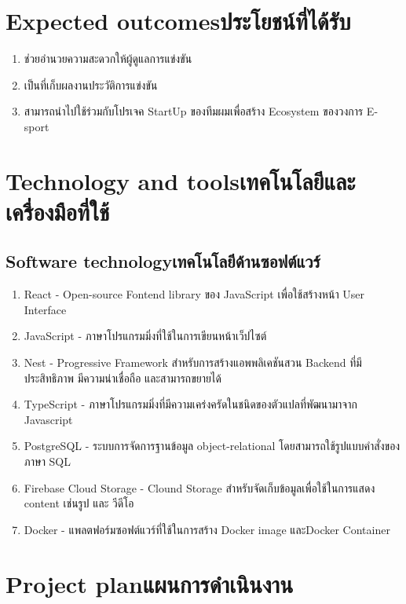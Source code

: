 \section{\ifenglish Expected outcomes\else ประโยชน์ที่ได้รับ\fi}
\begin{enumerate}
    \item ช่วยอำนวยความสะดวกให้ผู้ดูแลการแข่งขัน
    \item เป็นที่เก็บผลงานประวัติการแข่งขัน
    \item สามารถนำไปใช้ร่วมกับโปรเจค StartUp ของทีมผมเพื่อสร้าง Ecosystem ของวงการ E-sport
\end{enumerate}

\section{\ifenglish Technology and tools\else เทคโนโลยีและเครื่องมือที่ใช้\fi}

\subsection{\ifenglish Software technology\else เทคโนโลยีด้านซอฟต์แวร์\fi}
\begin{enumerate}
    \item React\cite{react} - Open-source Fontend library ของ JavaScript เพื่อใช้สร้างหน้า User Interface
    \item JavaScript\cite{javascript} - ภาษาโปรแกรมมิ่งที่ใช้ในการเขียนหน้าเว็ปไซต์
    \item Nest\cite{nest} - Progressive Framework สำหรับการสร้างแอพพลิเคชันสวน Backend ที่มีประสิทธิภาพ มีความน่าเชื่อถือ และสามารถขยายได้
    \item TypeScript\cite{typescript} - ภาษาโปรแกรมมิ่งที่มีความเคร่งครัดในชนิดของตัวแปลที่พัฒนามาจาก Javascript
    \item PostgreSQL\cite{postgresql} - ระบบการจัดการฐานข้อมูล object-relational โดยสามารถใช้รูปแบบคำสั่งของภาษา SQL
    \item Firebase Cloud Storage\cite{firebase} - Clound Storage สำหรับจัดเก็บข้อมูลเพื่อใช้ในการแสดง content เช่นรูป และ วีดีโอ
    \item Docker\cite{docker} - แพลตฟอร์มซอฟต์แวร์ที่ใช้ในการสร้าง Docker image และDocker Container 
\end{enumerate}

\section{\ifenglish Project plan\else แผนการดำเนินงาน\fi}

